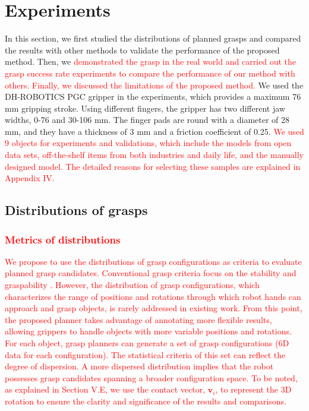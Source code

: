 \documentclass[journal]{IEEEtran}
\newcommand{\rev}[1]{\textcolor{red}{#1}}
\begin{document}
\section{Experiments}
\label{sec:experiments}
In this section, we first studied the distributions of planned grasps and compared the results with other methods to validate the performance of the proposed method. Then, we \rev{demonstrated the grasp in the real world and carried out the grasp success rate experiments to compare the performance of our method with others. Finally, we discussed the limitations of the proposed method.} We used the DH-ROBOTICS PGC gripper in the experiments, which provides a maximum 76 mm gripping stroke. Using different fingers, the gripper has two different jaw widths, 0-76 and 30-106 mm. The finger pads are round with a diameter of 28 mm, and they have a thickness of 3 mm and a friction coefficient of 0.25. \rev{We used 9 objects for experiments and validations, which include the models from open data sets, off-the-shelf items from both industries and daily life, and the manually designed model. The detailed reasons for selecting these samples are explained in Appendix IV.}


\subsection{Distributions of grasps}
\subsubsection{\rev{Metrics of distributions}}
\rev{We propose to use the distributions of grasp configurations as criteria to evaluate planned grasp candidates. Conventional grasp criteria focus on the stability \cite{harada2011grasp} and graspability \cite{domae2014fast}
. However, the distribution of grasp configurations, which characterizes the range of positions and rotations through which robot hands can approach and grasp objects, is rarely addressed in existing work. From this point, the proposed planner takes advantage of annotating more flexible results, allowing grippers to handle objects with more variable positions and rotations. For each object, grasp planners can generate a set of grasp configurations (6D data for each configuration). The statistical criteria of this set can reflect the degree of dispersion. A more dispersed distribution implies that the robot possesses grasp candidates spanning a broader configuration space. To be noted, as explained in Section V.E, we use the contact vector, $\mathbf{v}_i$, to represent the 3D rotation to ensure the clarity and significance of the results and comparisons.}
\end{document}
